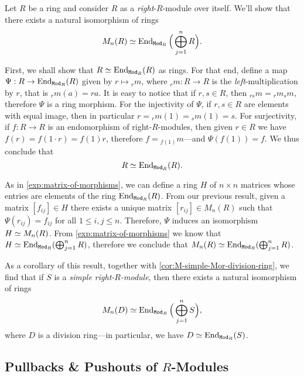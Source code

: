 \begin{example}
\label{exp:matrix-of-morphisms-over-ring}
Let \(R\) be a ring and consider \(R\) as a \emph{right}-\(R\)-module over
itself. We'll show that there exists a natural isomorphism of rings
\[
M_n(R) \simeq \operatorname{End}_{{\texttt{Mod}_{R}}}\Big( \bigoplus_{j=1}^n R \Big).
\]

First, we shall show that \(R \simeq \operatorname{End}_{{\texttt{Mod}_{R}}}(R)\) as rings. For that end,
define a map \(\Psi: R \to \operatorname{End}_{{\texttt{Mod}_{R}}}(R)\) given by \(r \mapsto {}_rm\),
where \({}_rm: R \to R\) is the \emph{left}-multiplication by \(r\), that is
\({}_rm(a) = r a\). It is easy to notice that if \(r, s \in R\), then
\({}_{r s}m = {}_rm {}_sm\), therefore \(\Psi\) is a ring morphism. For the
injectivity of \(\Psi\), if \(r, s \in R\) are elements with equal image, then
in particular \(r = {}_rm(1) = {}_sm(1) = s\). For surjectivity, if
\(f: R \to R\) is an endomorphism of right-\(R\)-modules, then given \(r \in R\)
we have \(f(r) = f(1 \cdot r) = f(1) r\), therefore \(f = {}_{f(1)}m\)---and
\(\Psi(f(1)) = f\). We thus conclude that
\[
R \simeq \operatorname{End}_{{\texttt{Mod}_{R}}}(R).
\]

As in \cref{exp:matrix-of-morphisms}, we can define a ring \(H\) of
\(n \times n\) matrices whose entries are elements of the ring
\(\operatorname{End}_{{\texttt{Mod}_{R}}}(R)\). From our previous result, given a matrix
\([f_{ij}] \in H\) there exists a unique matrix \([r_{ij}] \in M_n(R)\) such
that \(\Psi(r_{ij}) = f_{ij}\) for all \(1 \leq i, j \leq n\). Therefore,
\(\Psi\) induces an isomorphism \(H \simeq M_n(R)\). From
\cref{exp:matrix-of-morphisms} we know that
\(H \simeq \operatorname{End}_{{\texttt{Mod}_{R}}}(\bigoplus_{j=1}^n R)\), therefore we conclude that
\(M_n(R) \simeq \operatorname{End}_{{\texttt{Mod}_{R}}}(\bigoplus_{j=1}^n R)\).

As a corollary of this result, together with
\cref{cor:M-simple-Mor-division-ring}, we find that if \(S\) is a \emph{simple
  right-\(R\)-module}, then there exists a natural isomorphism of rings
\[
M_n(D) \simeq \operatorname{End}_{{\texttt{Mod}_{R}}}\Big(\bigoplus_{j=1}^n S \Big),
\]
where \(D\) is a division ring---in particular, we have
\(D \simeq \operatorname{End}_{{\texttt{Mod}_{R}}}(S)\).
\end{example}

\subsection{Pullbacks \& Pushouts of \texorpdfstring{\(R\)}{R}-Modules}


